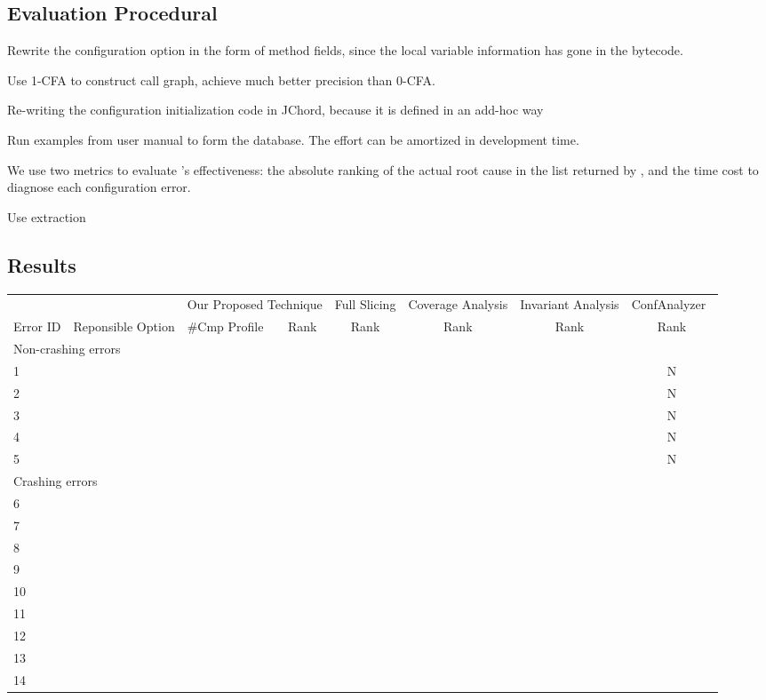 
\subsection{Evaluation Procedural}


Rewrite the configuration option in the form of method fields, since
the local variable information has gone in the bytecode.

Use 1-CFA to construct call graph, achieve much better precision
than 0-CFA. 

Re-writing the configuration initialization code in JChord, because
it is defined in an add-hoc way

Run examples from user manual to form the database. The effort
can be amortized in development time.

We use two metrics to evaluate \ourtool's effectiveness: the absolute ranking of the
actual root cause in the list returned by \ourtool, and the
time cost to diagnose each configuration error.

Use extraction~\cite{Rabkin:2011:SEP}


\subsection{Results}

\begin{table*}[t]
\setlength{\tabcolsep}{.54\tabcolsep}
\begin{tabular}{|l||l||l|l||c||c||c||c|}
\hline
  & & \multicolumn{2}{|c||}{Our Proposed Technique} & Full Slicing & Coverage Analysis& Invariant Analysis & ConfAnalyzer~\cite{Rabkin:2011:PPC}\\
\cline{3-8}
 Error ID & Reponsible Option & \#Cmp Profile & Rank  & Rank & Rank & Rank & Rank \\
 \hline
\hline
\multicolumn{8}{|l|}{Non-crashing errors}   \\
 \hline
 1 & & & & & & &N \\
 2 & & & & & & &N\\
 3 & & & & & & &N\\
 4 & & & & & & &N\\
 5 & & & & & & &N\\
\hline
\hline
\multicolumn{8}{|l|}{Crashing errors}   \\
\hline
 6 & & & & & & &\\
 7 & & & & & & &\\
 8 & & & & & & &\\
 9 & & & & & & &\\
 10 & & & & & & &\\
 11 & & & & & & &\\
 12 & & & & & & &\\
 13 & & & & & & &\\
 14 & & & & & & &\\
\hline
\end{tabular}

\end{table*}


